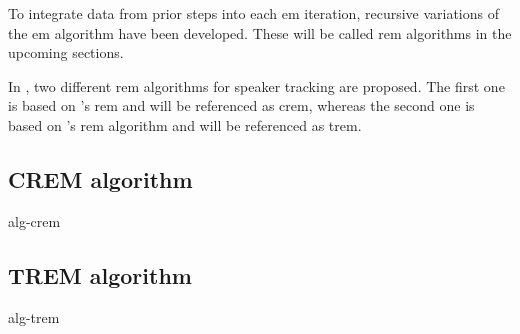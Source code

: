 To integrate data from prior steps into each \gls{em} iteration, recursive variations of the \gls{em} algorithm have been developed. These will be called \gls{rem} algorithms in the upcoming sections.

In \cite{Schwartz2014}, two different \gls{rem} algorithms for speaker tracking are proposed. The first one is based on \citeauthor{Cappe2009}'s \gls{rem} and will be referenced as \acrshort{crem}, whereas the second one is based on \citeauthor{Titterington1984}'s \gls{rem} algorithm and will be referenced as \acrshort{trem}.

\subsection{CREM algorithm}
\label{sec:crem}
{alg-crem}

\subsection{TREM algorithm}
\label{sec:trem}
{alg-trem}

